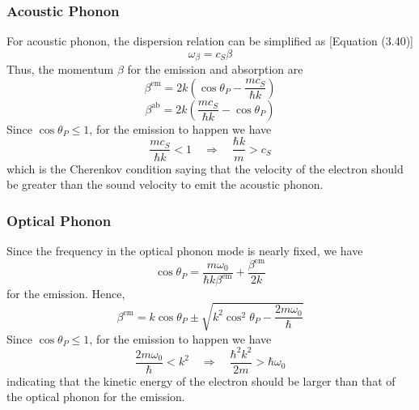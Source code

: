 \subsubsection{Acoustic Phonon}
For acoustic phonon, the dispersion relation can be simplified as [Equation (3.40)]\begin{equation}
    \omega_{\beta} = c_{S}\beta\nonumber
\end{equation} Thus, the momentum $\beta$ for the emission and absorption are \begin{equation}
    \beta^{\text{em}} = 2k\left(\cos{\theta_{P}}-\frac{mc_{S}}{\hbar k}\right)
\end{equation} \begin{equation}
    \beta^{\text{ab}} = 2k\left(\frac{mc_{S}}{\hbar k}-\cos{\theta_{P}}\right)
\end{equation} Since $\cos{\theta_{P}}\leq 1$, for the emission to happen we have \begin{equation}
    \frac{mc_{S}}{\hbar k}<1\quad\Rightarrow\quad\frac{\hbar k}{m}>c_{S}
\end{equation} which is the Cherenkov condition saying that the velocity of the electron should be greater than the sound velocity to emit the acoustic phonon.
\subsubsection{Optical Phonon}
Since the frequency in the optical phonon mode is nearly fixed, we have \begin{equation}
    \cos{\theta_{P}} = \frac{m\omega_{0}}{\hbar k \beta^{\text{em}}}+\frac{\beta^{\text{em}}}{2k}
\end{equation} for the emission. Hence, \begin{equation}
    \beta^{\text{em}} = k\cos{\theta_{P}}\pm\sqrt{k^{2}\cos^{2}{\theta_{P}}-\frac{2m\omega_{0}}{\hbar}}
\end{equation} Since $\cos{\theta_{P}}\leq 1$, for the emission to happen we have \begin{equation}
    \frac{2m\omega_{0}}{\hbar} < k^{2}\quad\Rightarrow\quad\frac{\hbar^{2}k^{2}}{2m}>\hbar\omega_{0}
\end{equation} indicating that the kinetic energy of the electron should be larger than that of the optical phonon for the emission.

